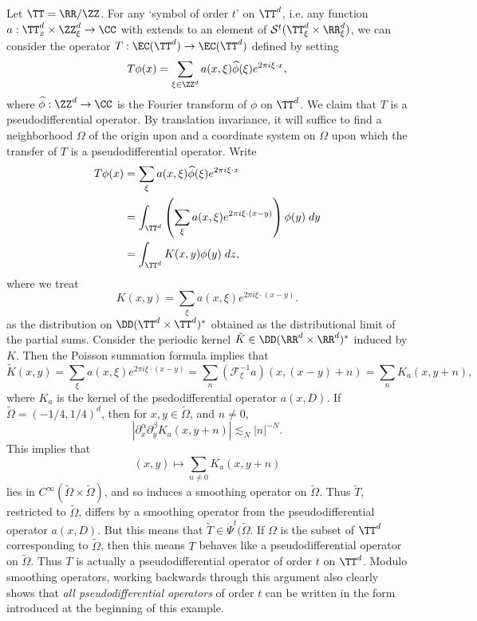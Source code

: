 \begin{example}
    Let $\TT = \RR / \ZZ$. For any `symbol of order $t$' on $\TT^d$, i.e. any function $a: \TT^d_x \times \ZZ^d_\xi \to \CC$ with extends to an element of $\mathcal{S}^t(\TT^d_\xi \times \RR^d_\xi)$, we can consider the operator $T: \EC(\TT^d) \to \EC(\TT^d)$ defined by setting
    \[ T\phi(x) = \sum_{\xi \in \ZZ^d} a(x,\xi) \widehat{\phi}(\xi) e^{2 \pi i \xi \cdot x}, \]
    where $\widehat{\phi}: \ZZ^d \to \CC$ is the Fourier transform of $\phi$ on $\TT^d$. We claim that $T$ is a pseudodifferential operator. By translation invariance, it will suffice to find a neighborhood $\Omega$ of the origin upon and a coordinate system on $\Omega$ upon which the transfer of $T$ is a pseudodifferential operator. Write
    \begin{align*}
        T\phi(x) &= \sum_\xi a(x,\xi) \widehat{\phi}(\xi) e^{2 \pi i \xi \cdot x}\\
        &= \int_{\TT^d} \left( \sum_\xi a(x,\xi) e^{2 \pi i \xi \cdot (x - y)} \right) \phi(y)\; dy\\
        &= \int_{\TT^d} K(x,y) \phi(y)\; dz,
    \end{align*}
    where we treat
    \[ K(x,y) = \sum_\xi a(x,\xi) e^{2 \pi i \xi \cdot (x - y)}. \]
    as the distribution on $\DD(\TT^d \times \TT^d)^*$ obtained as the distributional limit of the partial sums. Consider the periodic kernel $\tilde{K} \in \DD(\RR^d \times \RR^d)^*$ induced by $K$. Then the Poisson summation formula implies that
    \[ \tilde{K}(x,y) = \sum_\xi a(x,\xi) e^{2 \pi i \xi \cdot (x - y)} = \sum_n (\mathcal{F}_\xi^{-1} a)(x,(x-y) + n) = \sum_n K_a(x,y+n), \]
    where $K_a$ is the kernel of the psedodifferential operator $a(x,D)$. If $\widetilde{\Omega} = (-1/4,1/4)^d$, then for $x,y \in \widetilde{\Omega}$, and $n \neq 0$,
    \[ |\partial^\alpha_x \partial^\beta_y K_a(x,y+n)| \lesssim_N |n|^{-N}. \]
    This implies that
    \[ (x,y) \mapsto \sum_{n \neq 0} K_a(x,y+n) \]
    lies in $C^\infty(\widetilde{\Omega} \times \widetilde{\Omega})$, and so induces a smoothing operator on $\widetilde{\Omega}$. Thus $\tilde{T}$, restricted to $\tilde{\Omega}$, differs by a smoothing operator from the pseudodifferential operator $a(x,D)$. But this means that $\tilde{T} \in \dot{\Psi}^t(\widetilde{\Omega}$. If $\Omega$ is the subset of $\TT^d$ corresponding to $\widetilde{\Omega}$, then this means $T$ behaves like a pseudodifferential operator on $\widetilde{\Omega}$. Thus $T$ is actually a pseudodifferential operator of order $t$ on $\TT^d$. Modulo smoothing operators, working backwards through this argument also clearly shows that \emph{all pseudodifferential operators} of order $t$ can be written in the form introduced at the beginning of this example.


\end{example}
